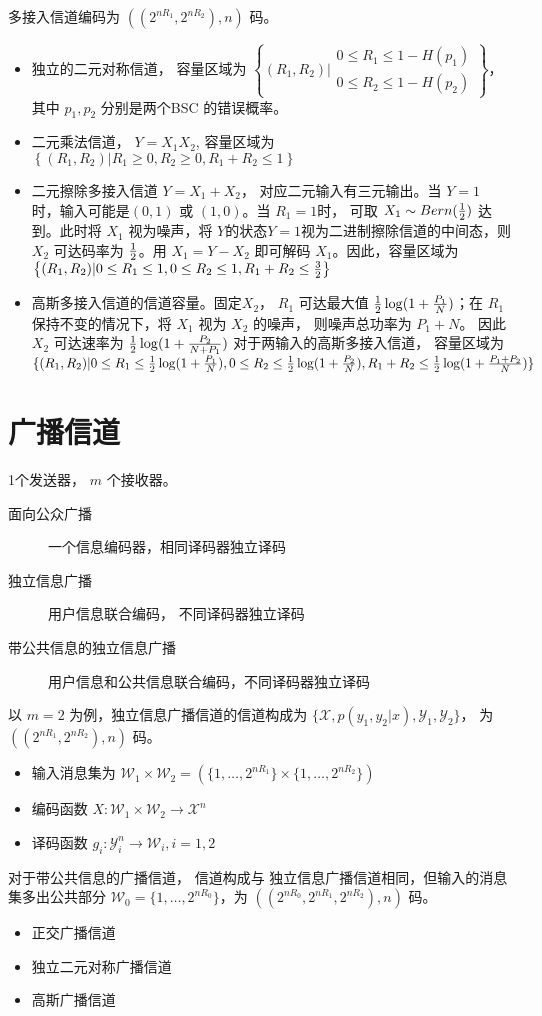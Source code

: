 \documentclass{article}
\def\X{\mathcal{X}}
\def\Y{\mathcal{Y}}
\def\W{\mathcal{W}}
\begin{document}
多接入信道编码为 $ ((2^{n R_1}, 2^{ n R_2}), n ) $ 码。
\begin{itemize}
\item 独立的二元对称信道， 容量区域为 $ \left\{(R_1, R_2) \Big\vert \begin{array}{c} 0 \leq R_1 \leq 1-H(p_1) \\
0 \leq R_2\leq 1 - H(p_2) \end{array} \right\}$， 其中 $p_1, p_2 $ 分别是两个BSC 的错误概率。
\item 二元乘法信道， $ Y = X_1 X_2 $, 容量区域为 
$ \left\{(R_1, R_2) | R_1\geq 0, R_2\geq 0, R_1 + R_2 \leq 1 \right\}$
\item 二元擦除多接入信道 $Y = X_1 + X_2 $， 对应二元输入有三元输出。当 $Y = 1 $ 时，输入可能是$(0, 1) $ 或 $(1, 0)$。当 $R_1 = 1 $时， 可取 $ X_1 \sim Bern({ 1 \over 2 } ) $ 达到。此时将 $X_1 $
视为噪声，将 $Y$的状态$Y=1$视为二进制擦除信道的中间态，则$X_2 $ 可达码率为 $ { 1 \over 2}$。用 $X_1 = Y - X_2 $ 即可解码 $X_1$。因此，容量区域为 $ \left\{(R_1, R_2)  | 0 \leq R_1 \leq 1, 0 \leq R_2\leq 1, R_1 + R_2 \leq {3 \over 2} \right\}$
\item 高斯多接入信道的信道容量。固定$X_2$， $R_1$ 可达最大值 $ { 1 \over 2} \log(1 + \frac{P_1}{N})$；在 $R_1$ 保持不变的情况下，将 $X_1$ 视为 $X_2 $ 的噪声， 则噪声总功率为 $P_1+N$。
因此 $X_2$ 可达速率为 $ { 1 \over 2} \log (1 + { P_2 \over N + P_1 } ) $ 
对于两输入的高斯多接入信道， 容量区域为 
$\{ (R_1, R_2) | 0 \leq R_1 \leq  { 1 \over 2} \log(1 + \frac{P_1}{N}),  0 \leq R_2 \leq  { 1 \over 2} \log(1 + \frac{P_2}{N}),
R_1 + R_2 \leq { 1 \over 2} \log(1 + \frac{P_1 + P_2}{N})
 \}$
\end{itemize}
\section{广播信道}
1个发送器， $m $ 个接收器。
\begin{description}
\item [面向公众广播] 一个信息编码器，相同译码器独立译码
\item [独立信息广播] 用户信息联合编码， 不同译码器独立译码
\item [带公共信息的独立信息广播] 用户信息和公共信息联合编码，不同译码器独立译码
\end{description}
以 $ m = 2$ 为例，独立信息广播信道的信道构成为 $\{ \X, p(y_1, y_2 | x), \Y_1, \Y_2 \} $， 为 $ ( (2^{ n R_1}, 2^{n R_2}), n ) $
码。
\begin{itemize}
\item 输入消息集为 $ \W_1 \times \W_2 = ( \{1, \dots, 2^{ n R_1 } \} \times \{1, \dots, 2^{ n R_2 } \} ) $
\item 编码函数 $ X: \W_1 \times \W_2 \to \X^n $
\item 译码函数 $ g_i : \Y_i^n \to \W_i, i = 1,2 $
\end{itemize}
对于带公共信息的广播信道， 信道构成与 独立信息广播信道相同，但输入的消息集多出公共部分 
$ \W_0 = \{ 1, \dots, 2^{ n R_0 } \} $，为 $ ( (2^{ n R_0}, 2^{ n R_1}, 2^{n R_2}), n ) $
码。
\begin{itemize}
\item 正交广播信道
\item 独立二元对称广播信道
\item 高斯广播信道
\end{itemize}
\end{document}
